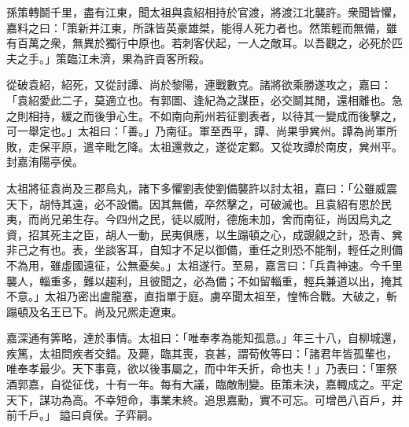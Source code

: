 \begin{pinyinscope}
 
孫策轉鬬千里，盡有江東，聞太祖與袁紹相持於官渡，將渡江北襲許。衆聞皆懼，嘉料之曰：「策新并江東，所誅皆英豪雄桀，能得人死力者也。然策輕而無備，雖有百萬之衆，無異於獨行中原也。若刺客伏起，一人之敵耳。以吾觀之，必死於匹夫之手。」策臨江未濟，果為許貢客所殺。
 
 
從破袁紹，紹死，又從討譚、尚於黎陽，連戰數克。諸將欲乘勝遂攻之，嘉曰：「袁紹愛此二子，莫適立也。有郭圖、逢紀為之謀臣，必交鬬其閒，還相離也。急之則相持，緩之而後爭心生。不如南向荊州若征劉表者，以待其一變成而後擊之，可一舉定也。」太祖曰：「善。」乃南征。軍至西平，譚、尚果爭兾州。譚為尚軍所敗，走保平原，遣辛毗乞降。太祖還救之，遂從定鄴。又從攻譚於南皮，兾州平。封嘉洧陽亭侯。
 
 
 
 
 太祖將征袁尚及三郡烏丸，諸下多懼劉表使劉備襲許以討太祖，嘉曰：「公雖威震天下，胡恃其遠，必不設備。因其無備，卒然擊之，可破滅也。且袁紹有恩於民夷，而尚兄弟生存。今四州之民，徒以威附，德施未加，舍而南征，尚因烏丸之資，招其死主之臣，胡人一動，民夷俱應，以生蹋頓之心，成覬覦之計，恐青、兾非己之有也。表，坐談客耳，自知才不足以御備，重任之則恐不能制，輕任之則備不為用，雖虛國遠征，公無憂矣。」太祖遂行。至易，嘉言曰：「兵貴神速。今千里襲人，輜重多，難以趨利，且彼聞之，必為備；不如留輜重，輕兵兼道以出，掩其不意。」太祖乃密出盧龍塞，直指單于庭。虜卒聞太祖至，惶怖合戰。大破之，斬蹋頓及名王已下。尚及兄熈走遼東。
 
 
嘉深通有筭略，達於事情。太祖曰：「唯奉孝為能知孤意。」年三十八，自柳城還，疾篤，太祖問疾者交錯。及薨，臨其喪，哀甚，謂荀攸等曰：「諸君年皆孤輩也，唯奉孝最少。天下事竟，欲以後事屬之，而中年夭折，命也夫！」乃表曰：「軍祭酒郭嘉，自從征伐，十有一年。每有大議，臨敵制變。臣策未決，嘉輙成之。平定天下，謀功為高。不幸短命，事業未終。追思嘉勳，實不可忘。可增邑八百戶，并前千戶。」
 謚曰貞侯。子弈嗣。
 

\end{pinyinscope}
